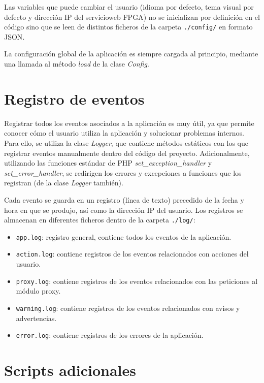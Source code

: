 Las variables que puede cambiar el usuario (idioma por defecto, tema visual por defecto y dirección IP del \gls{servicioweb} \gls{FPGA}) no se inicializan por definición en el código sino que se leen de distintos ficheros de la carpeta \texttt{./config/} en formato \gls{JSON}.

La configuración global de la aplicación es siempre cargada al principio, mediante una llamada al método \textit{load} de la clase \textit{Config}.

\section{Registro de eventos\label{extra:mvc:logger}}

Registrar todos los eventos asociados a la aplicación es muy útil, ya que permite conocer cómo el usuario utiliza la aplicación y solucionar problemas internos. Para ello, se utiliza la clase \textit{Logger}, que contiene métodos estáticos con los que registrar eventos manualmente dentro del código del proyecto. Adicionalmente, utilizando las funciones estándar de \gls{PHP} \textit{set\_exception\_handler} y \textit{set\_error\_handler}, se redirigen los errores y excepciones a funciones que los registran (de la clase \textit{Logger} también).

Cada evento se guarda en un registro (línea de texto) precedido de la fecha y hora en que se produjo, así como la dirección IP del usuario. Los registros se almacenan en diferentes ficheros dentro de la carpeta \texttt{./log/}:
\begin{itemize}
  \item \texttt{app.log}: registro general, contiene todos los eventos de la aplicación.
  \item \texttt{action.log}: contiene registros de los eventos relacionados con acciones del usuario.
  \item \texttt{proxy.log}: contiene registros de los eventos relacionados con las peticiones al módulo proxy.
  \item \texttt{warning.log}: contiene registros de los eventos relacionados con avisos y advertencias.
  \item \texttt{error.log}: contiene registros de los errores de la aplicación.
\end{itemize}


\section{Scripts adicionales\label{extra:mvc:scripts}}

